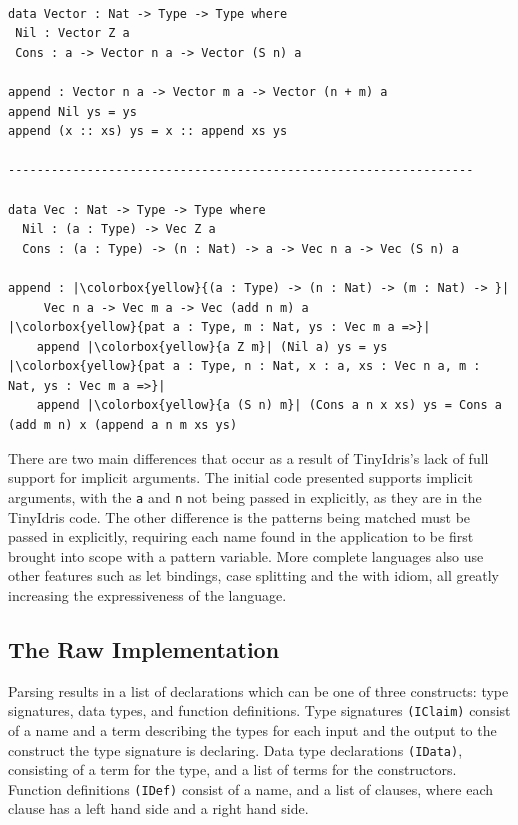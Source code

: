\documentclass[a4paper]{article}
\begin{document}
\begin{center}
\begin{verbatim}

data Vector : Nat -> Type -> Type where
 Nil : Vector Z a
 Cons : a -> Vector n a -> Vector (S n) a

append : Vector n a -> Vector m a -> Vector (n + m) a
append Nil ys = ys
append (x :: xs) ys = x :: append xs ys

-----------------------------------------------------------------

data Vec : Nat -> Type -> Type where
  Nil : (a : Type) -> Vec Z a
  Cons : (a : Type) -> (n : Nat) -> a -> Vec n a -> Vec (S n) a

append : |\colorbox{yellow}{(a : Type) -> (n : Nat) -> (m : Nat) -> }|
	 Vec n a -> Vec m a -> Vec (add n m) a
|\colorbox{yellow}{pat a : Type, m : Nat, ys : Vec m a =>}|
	append |\colorbox{yellow}{a Z m}| (Nil a) ys = ys
|\colorbox{yellow}{pat a : Type, n : Nat, x : a, xs : Vec n a, m : Nat, ys : Vec m a =>}|
	append |\colorbox{yellow}{a (S n) m}| (Cons a n x xs) ys = Cons a (add m n) x (append a n m xs ys)
\end{verbatim}
\end{center}

There are two main differences that occur as a result of TinyIdris's lack of full
support for implicit arguments. The initial code presented supports
implicit arguments, with the \texttt{a} and \texttt{n} not being passed in explicitly,
as they are in the TinyIdris code. The other difference is the patterns
being matched must be passed in explicitly, requiring each name found 
in the application to be first brought into scope with a pattern 
variable. More complete languages also use other features such as let 
bindings, case splitting and the with idiom, all greatly increasing the
expressiveness of the language.

\subsection{The Raw Implementation}
\label{sec:orgbff7c18}
Parsing results in a list of declarations which can be one of three constructs: type signatures, data types, and function definitions.
Type signatures \texttt{(IClaim)} consist of a name and a term describing the types for each input and the output to the construct the type signature is declaring. Data type 
declarations \texttt{(IData)}, consisting of a term for the type, and a list of
terms for the constructors. Function definitions \texttt{(IDef)} consist of a
name, and a list of clauses, where each clause has a left hand side and
a right hand side. 
\end{document}
